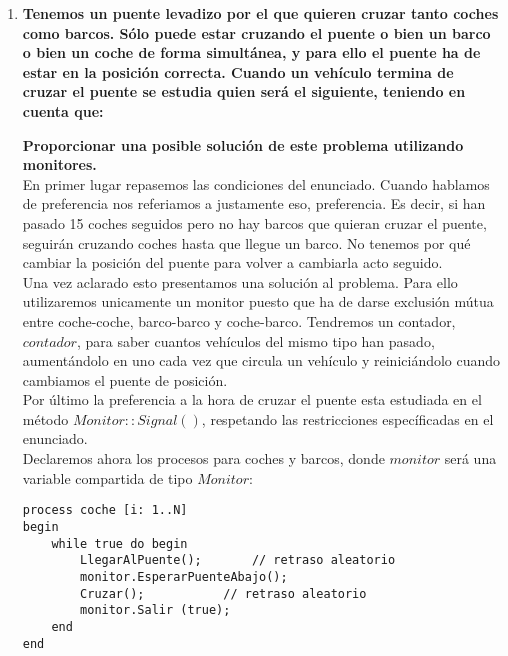\documentclass[11pt,a4paper]{article}
\begin{document}
\begin{enumerate}
\item \large{\textbf{Tenemos un puente levadizo por el que quieren cruzar tanto coches como barcos. Sólo puede estar cruzando el puente o bien un barco o bien un coche de forma simultánea, y para ello el puente ha de estar en la posición correcta. Cuando un vehículo termina de cruzar el puente se estudia quien será el siguiente, teniendo en cuenta que:  }}


\large{\textbf{Proporcionar una posible solución de este problema utilizando monitores.}} \\

En primer lugar repasemos las condiciones del enunciado. Cuando hablamos de preferencia nos referiamos a justamente eso, preferencia. Es decir, si han pasado 15 coches seguidos pero no hay barcos que quieran cruzar el puente, seguirán cruzando coches hasta que llegue un barco. No tenemos por qué cambiar la posición del puente para volver a cambiarla acto seguido. \\

Una vez aclarado esto presentamos una solución al problema. Para ello utilizaremos unicamente un monitor puesto que ha de darse exclusión mútua entre coche-coche, barco-barco y coche-barco. Tendremos un contador, $contador$, para saber cuantos vehículos del mismo tipo han pasado, aumentándolo en uno cada vez que circula un vehículo y reiniciándolo cuando cambiamos el puente de posición. \\

Por último la preferencia a la hora de cruzar el puente esta estudiada en el método $Monitor::Signal()$, respetando las restricciones específicadas en el enunciado. \\

Declaremos ahora los procesos para coches y barcos, donde $monitor$ será una variable compartida de tipo $Monitor$:

\begin{lstlisting}
process coche [i: 1..N]
begin
	while true do begin
		LlegarAlPuente();		// retraso aleatorio
		monitor.EsperarPuenteAbajo();
		Cruzar();			// retraso aleatorio
		monitor.Salir (true);
	end
end
\end{lstlisting}


\end{enumerate}
\end{document}

